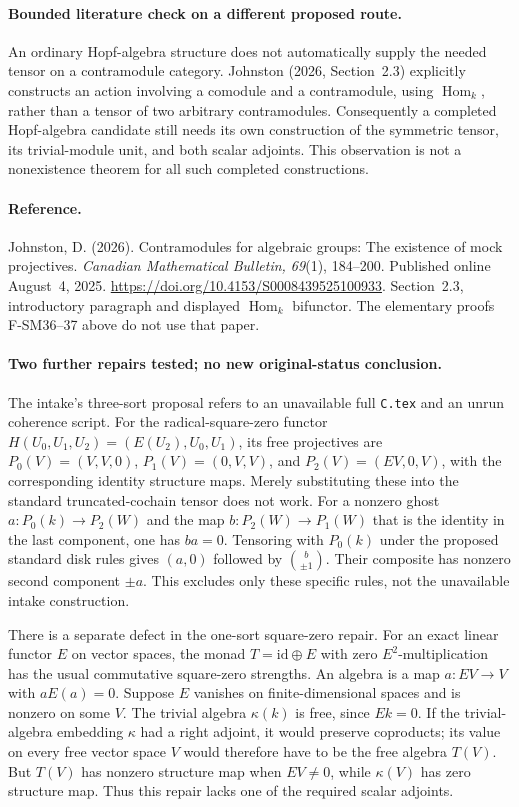 \paragraph{Bounded literature check on a different proposed route.}
An ordinary Hopf-algebra structure does not automatically supply
the needed tensor on a contramodule category.  Johnston (2026,
Section~2.3) explicitly constructs an action involving a comodule
and a contramodule, using \(\operatorname{Hom}_k\), rather than
a tensor of two arbitrary contramodules.  Consequently a
completed Hopf-algebra candidate still needs its own construction
of the symmetric tensor, its trivial-module unit, and both
scalar adjoints.  This observation is not a nonexistence theorem
for all such completed constructions.

\paragraph{Reference.}
Johnston, D. (2026). Contramodules for algebraic groups: The
existence of mock projectives. \emph{Canadian Mathematical
Bulletin, 69}(1), 184--200. Published online August~4, 2025.
\url{https://doi.org/10.4153/S0008439525100933}.
Section~2.3, introductory paragraph and displayed
\(\operatorname{Hom}_k\) bifunctor.  The elementary proofs
F-SM36--37 above do not use that paper.

\paragraph{Two further repairs tested; no new original-status conclusion.}
The intake's three-sort proposal refers to an unavailable full
\texttt{C.tex} and an unrun coherence script.  For the radical-square-zero
functor \(H(U_0,U_1,U_2)=(E(U_2),U_0,U_1)\), its free projectives are
\(P_0(V)=(V,V,0)\), \(P_1(V)=(0,V,V)\), and
\(P_2(V)=(EV,0,V)\), with the corresponding identity structure maps.
Merely substituting these into the standard truncated-cochain tensor
does not work.  For a nonzero ghost
\(a:P_0(k)\to P_2(W)\) and the map
\(b:P_2(W)\to P_1(W)\) that is the identity in the last component,
one has \(ba=0\).  Tensoring with \(P_0(k)\) under the proposed
standard disk rules gives \((a,0)\) followed by
\(\binom{b}{\pm1}\).  Their composite has nonzero second component
\(\pm a\).  This excludes only these specific rules, not the
unavailable intake construction.

There is a separate defect in the one-sort square-zero repair.
For an exact linear functor \(E\) on vector spaces, the monad
\(T=\mathrm{id}\oplus E\) with zero \(E^2\)-multiplication has
the usual commutative square-zero strengths.  An algebra is a map
\(a:EV\to V\) with \(aE(a)=0\).  Suppose \(E\) vanishes on
finite-dimensional spaces and is nonzero on some \(V\).
The trivial algebra \(\kappa(k)\) is free, since \(Ek=0\).
If the trivial-algebra embedding \(\kappa\) had a right adjoint,
it would preserve coproducts; its value on every free vector space
\(V\) would therefore have to be the free algebra \(T(V)\).
But \(T(V)\) has nonzero structure map when \(EV\ne0\), while
\(\kappa(V)\) has zero structure map.  Thus this repair lacks
one of the required scalar adjoints.


